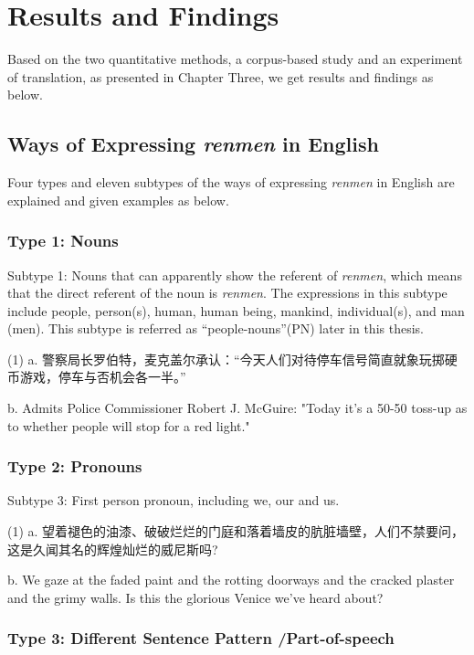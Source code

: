 \documentclass[degree=bachelor,language=english]{sysuthesis}
\begin{document}
\chapter{Results and Findings}

Based on the two quantitative methods, a corpus-based study and an experiment of translation, as presented in Chapter Three, we get results and findings as below.



\section{Ways of Expressing \emph{renmen} in English}

Four types and eleven subtypes of the ways of expressing \emph{renmen} in English are explained and given examples as below.


\subsection{Type 1: Nouns}

Subtype 1: Nouns that can apparently show the referent of \emph{renmen}, which means that the direct referent of the noun is \emph{renmen}. The expressions in this subtype include people, person(s), human, human being, mankind, individual(s), and man (men). This subtype is referred as “people-nouns”(PN) later in this thesis.

(1) a. 警察局长罗伯特，麦克盖尔承认：“今天人们对待停车信号简直就象玩掷硬币游戏，停车与否机会各一半。”

b. Admits Police Commissioner Robert J. McGuire: "Today it's a 50-50 toss-up as to whether people will stop for a red light."


\subsection{Type 2: Pronouns}

Subtype 3: First person pronoun, including we, our and us.

(1) a. 望着褪色的油漆、破破烂烂的门庭和落着墙皮的肮脏墙壁，人们不禁要问，这是久闻其名的辉煌灿烂的威尼斯吗?

b. We gaze at the faded paint and the rotting doorways and the cracked plaster and the grimy walls. Is this the glorious Venice we've heard about?


\subsection{Type 3: Different Sentence Pattern /Part-of-speech}
\end{document}
